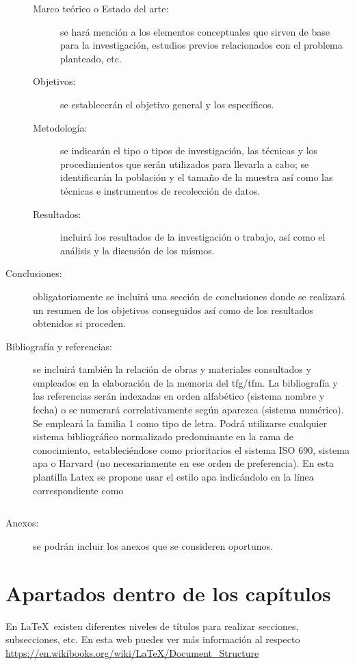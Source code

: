 \begin{description}
\begin{description}
\item[Marco teórico o Estado del arte:] se hará mención a los elementos conceptuales que sirven de base para la investigación, estudios previos relacionados con el problema planteado, etc.
\item[Objetivos:] se establecerán el objetivo general y los específicos.
\item[Metodología:] se indicarán el tipo o tipos de investigación, las técnicas y los procedimientos que serán utilizados para llevarla a cabo; se identificarán la población y el tamaño de la muestra así como las técnicas e instrumentos de recolección de datos.
\item[Resultados:] incluirá los resultados de la investigación o trabajo, así como el análisis y la discusión de los mismos.
\end{description}
\item[Conclusiones:] obligatoriamente se incluirá una sección de conclusiones donde se realizará un resumen de los objetivos conseguidos así como de los resultados obtenidos si proceden.
\item[Bibliografía y referencias:] se incluirá también la relación de obras y materiales consultados y empleados en la elaboración de la memoria del \gls{tfg}/\gls{tfm}. La bibliografía y las referencias serán indexadas en orden alfabético (sistema nombre y fecha) o se numerará correlativamente según aparezca (sistema numérico). Se empleará la familia 1 como tipo de letra. Podrá utilizarse cualquier sistema bibliográfico normalizado predominante en la rama de conocimiento, estableciéndose como prioritarios el sistema ISO 690, sistema \gls{apa}  o Harvard (no necesariamente en ese orden de preferencia). En esta plantilla Latex se propone usar el estilo \gls{apa} indicándolo en la línea correspondiente como 
\begin{verbatim}

\end{verbatim}


\item[Anexos:] se podrán incluir los anexos que se consideren oportunos.

\end{description}

\section{Apartados dentro de los capítulos}
En \LaTeX~existen diferentes niveles de títulos para realizar secciones, subsecciones, etc. En esta web puedes ver más información al respecto \url{https://en.wikibooks.org/wiki/LaTeX/Document_Structure}

